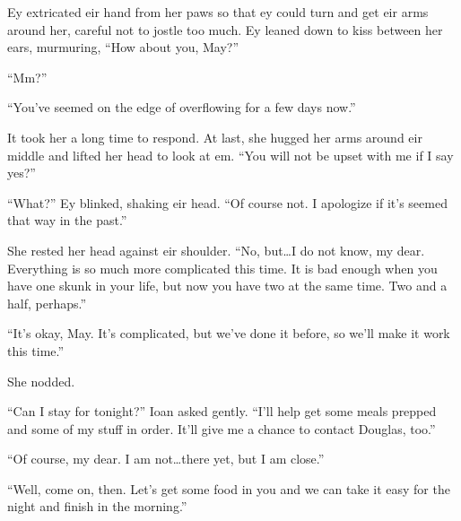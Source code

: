 Ey extricated eir hand from her paws so that ey could turn and get eir arms around her, careful not to jostle too much. Ey leaned down to kiss between her ears, murmuring, ``How about you, May?''

``Mm?''

``You've seemed on the edge of overflowing for a few days now.''

It took her a long time to respond. At last, she hugged her arms around eir middle and lifted her head to look at em. ``You will not be upset with me if I say yes?''

``What?'' Ey blinked, shaking eir head. ``Of course not. I apologize if it's seemed that way in the past.''

She rested her head against eir shoulder. ``No, but\ldots I do not know, my dear. Everything is so much more complicated this time. It is bad enough when you have one skunk in your life, but now you have two at the same time. Two and a half, perhaps.''

``It's okay, May. It's complicated, but we've done it before, so we'll make it work this time.''

She nodded.

``Can I stay for tonight?'' Ioan asked gently. ``I'll help get some meals prepped and some of my stuff in order. It'll give me a chance to contact Douglas, too.''

``Of course, my dear. I am not\ldots there yet, but I am close.''

``Well, come on, then. Let's get some food in you and we can take it easy for the night and finish in the morning.''
